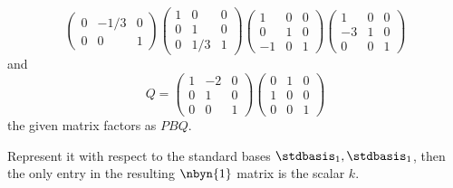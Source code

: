 \begin{ans}{3}
\begin{equation*}
\begin{pmatrix}
          0  &-1/3 &0  \\
          0  &0    &1
        \end{pmatrix}
        \begin{pmatrix}
          1  &0    &0  \\
          0  &1    &0  \\
          0  &1/3  &1
        \end{pmatrix}
        \begin{pmatrix}
          1  &0  &0  \\
          0  &1  &0  \\
         -1  &0  &1
        \end{pmatrix}
        \begin{pmatrix}
          1  &0  &0  \\
         -3  &1  &0  \\
          0  &0  &1
        \end{pmatrix}
      \end{equation*}
      and
      \begin{equation*}
        Q=
        \begin{pmatrix}
          1  &-2    &0  \\
          0  &1     &0  \\
          0  &0     &1
        \end{pmatrix}
        \begin{pmatrix}
          0  &1     &0  \\
          1  &0     &0  \\
          0  &0     &1
        \end{pmatrix}
      \end{equation*}
      the given matrix factors as $PBQ$.
    
\end{ans}
\begin{ans}{4}
      Represent it with respect to the
      standard bases $\stdbasis_1,\stdbasis_1$, then the
      only entry in the resulting $\nbyn{1}$ matrix is the scalar $k$.
    
\end{ans}
